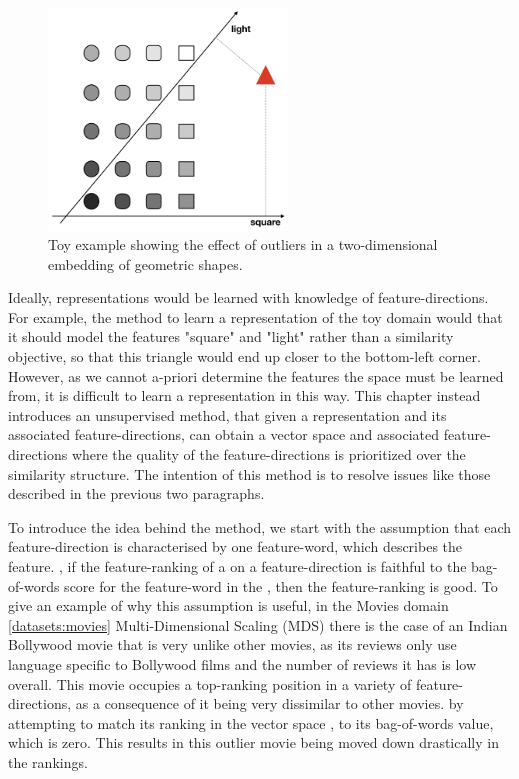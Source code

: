 \begin{figure}
	\centering
	\includegraphics[width=180pt]{images/shapes}
	\caption{Toy example showing the effect of outliers in a two-dimensional embedding of geometric shapes.}
	\label{fig:toyExample}
\end{figure}

Ideally, representations would be learned with knowledge of feature-directions. For example, the method to learn a representation of the toy domain would  that it should model the features "square" and "light" rather than a similarity objective, so that this triangle would end up closer to the bottom-left corner. However, as we cannot a-priori determine the features the space must be learned from, it is difficult to learn a representation in this way. This chapter instead introduces an unsupervised method, that given a representation and its associated feature-directions,  can obtain a  vector space and associated feature-directions where the quality of the feature-directions is prioritized  over the similarity structure. The intention of this method is to resolve issues like those described in the previous two paragraphs.

To introduce the idea behind the method, we start with the assumption that each feature-direction is characterised by one feature-word, which describes the feature. , if the feature-ranking of a  on a feature-direction is faithful to the bag-of-words score for the feature-word in the , then the feature-ranking is good. To give an example of why this assumption is useful, in the Movies domain \ref{datasets:movies} Multi-Dimensional Scaling (MDS)  there is the case of an Indian Bollywood movie that is very unlike other movies, as its reviews only use language specific to Bollywood films and the number of reviews it has is low overall. This movie occupies a top-ranking position in a variety of feature-directions,  as a consequence of it being very dissimilar to other movies.  by attempting to match its  ranking in the vector space , to its bag-of-words value, which is zero. This results in this  outlier movie being moved down drastically in the rankings. 

